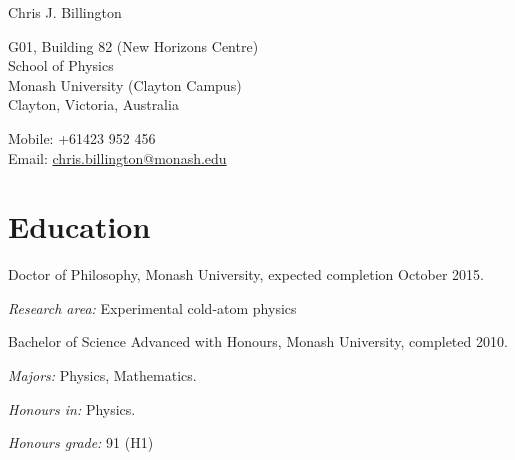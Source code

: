 \documentclass[10pt,letterpaper]{article}
\def\name{Chris J. Billington}
\renewenvironment{itemize}{
  \begin{list}{}{
    \setlength{\leftmargin}{1.5em}
    \setlength{\itemsep}{0.25em}
    \setlength{\parskip}{0pt}
    \setlength{\parsep}{0.25em}
  }
}{
  \end{list}
}
\begin{document}
{\huge \name}

\bigskip

\begin{minipage}[t]{0.5\textwidth}
  G01, Building 82 (New Horizons Centre) \\
  School of Physics \\
  Monash University (Clayton Campus) \\
  Clayton, Victoria, Australia
\end{minipage}
\begin{minipage}[t]{0.5\textwidth}
  Mobile: +61423 952 456 \\
  Email: \href{mailto:chris.billington@monash.edu}{chris.billington@monash.edu} \\
\end{minipage}

\section*{Education}

\begin{itemize}
  \item Doctor of Philosophy, Monash University, expected completion October 2015.
    \begin{itemize}
    \item \textit{Research area:}
      Experimental cold-atom physics
    \end{itemize}
    
  \item Bachelor of Science Advanced with Honours, Monash University, completed 2010.
    \begin{itemize}
    \item \textit{Majors:}
      Physics, Mathematics.
    \item \textit{Honours in:}
      Physics.
    \item \textit{Honours grade:} 91 (H1)
    \end{itemize}
    
  
\end{itemize}
\end{document}
